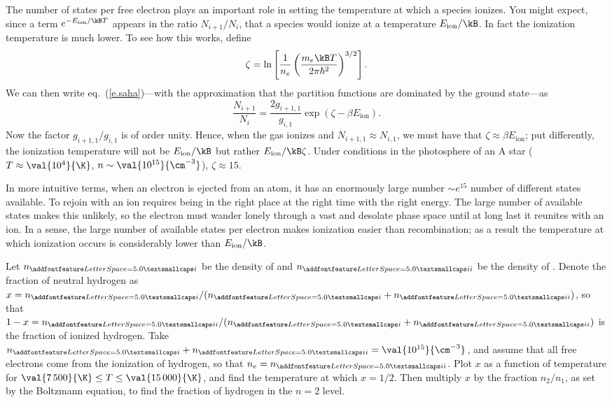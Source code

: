 The number of states per free electron plays an important role in setting the temperature at which a species ionizes. You might expect, since a term $e^{-E_{\mathrm{ion}}/\kB T}$ appears in the ratio $N_{i+1}/N_{i}$, that a species would ionize at a temperature $E_{\mathrm{ion}}/\kB$. In fact the ionization temperature is much lower. To see how this works, define
\[
	\zeta = \ln\left[\frac{1}{n_{e}}\left(\frac{m_{e}\kB T}{2\pi\hbar^{2}}\right)^{3/2}\right].
\]
We can then write eq.~(\ref{e.saha})---with the approximation that the partition functions are dominated by the ground state---as
\[
	\frac{N_{i+1}}{N_{i}} = \frac{2g_{i+1,1}}{g_{i,1}}\exp\left(\zeta - \beta E_{\mathrm{ion}}\right).
\]
Now the factor $g_{i+1,1}/g_{i,1}$ is of order unity. Hence, when the gas ionizes and $N_{i+1,1}\approx N_{i,1}$, we must have that $\zeta\approx \beta E_{\mathrm{ion}}$; put differently, the ionization temperature will not be $E_{\mathrm{ion}}/\kB$ but rather $E_{\mathrm{ion}}/\kB\zeta$. Under conditions in the photosphere of an A star ($T \approx \val{10^{4}}{\K}$, $n\sim \val{10^{15}}{\cm^{-3}}$), $\zeta \approx 15$.

In more intuitive terms, when an electron is ejected from an atom, it has an enormously large number $\sim e^{15}$ number of different states available. To rejoin with an ion requires being in the right place at the right time with the right energy. The large number of available states makes this unlikely, so the electron must wander lonely through a vast and desolate phase space until at long last it reunites with an ion. In a sense, the large number of available states per electron makes ionization easier than recombination; as a result the temperature at which ionization occurs is considerably lower than $E_{\mathrm{ion}}/\kB$.

\begin{exercisebox}
\label{ex.strong-Balmer}
Let $n_{\textsc{i}}$ be the density of  and $n_{\textsc{ii}}$ be the density of . Denote the fraction of neutral hydrogen as $x = n_{\textsc{i}}/(n_{\textsc{i}}+n_{\textsc{ii}})$, so that $1-x = n_{\textsc{ii}}/(n_{\textsc{i}}+n_{\textsc{ii}})$ is the fraction of ionized hydrogen. Take $n_{\textsc{i}}+n_{\textsc{ii}} = \val{10^{15}}{\cm^{-3}}$, and assume that all free electrons come from the ionization of hydrogen, so that $n_{e} = n_{\textsc{ii}}$. Plot $x$ as a function of temperature for $\val{7\,500}{\K}\le T\le \val{15\,000}{\K}$, and find the temperature at which $x = 1/2$. Then multiply $x$ by the fraction $n_{2}/n_{1}$, as set by the Boltzmann equation, to find the fraction of hydrogen in the $n=2$ level.
\end{exercisebox}

